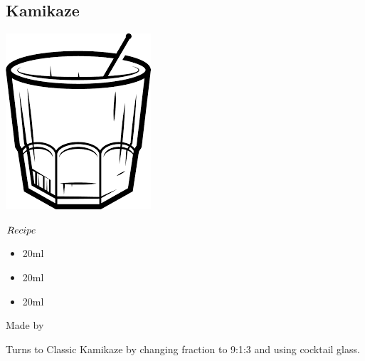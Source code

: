 \subsection{Kamikaze}
\vspace{-7.5mm}
\hspace{32mm}
\includegraphics[scale=.06]{cocktail_glass_rock.png}
\vspace{2.5mm}
\begin{itembox}[l]{\boldmath $Recipe$}
\begin{itemize}
\setlength{\parskip}{0cm}
\setlength{\itemsep}{0cm}
\item \vodka 20ml
\item \wc 20ml
\item \limj 20ml
\end{itemize}
\vspace{-4mm}
Made by \shake
\end{itembox}
Turns to Classic Kamikaze by changing fraction to 9:1:3 and using cocktail glass.
